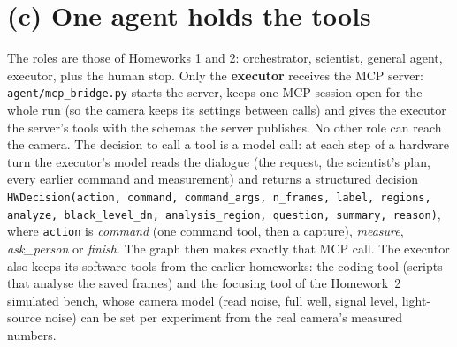 \documentclass[11pt,a4paper]{article}
\begin{document}
\section*{(c) One agent holds the tools}
The roles are those of Homeworks 1 and 2: orchestrator, scientist, general agent, executor, plus the human stop. Only the
\textbf{executor} receives the MCP server: \texttt{agent/mcp\_bridge.py} starts the server, keeps one MCP session open for
the whole run (so the camera keeps its settings between calls) and gives the executor the server's tools with the schemas
the server publishes. No other role can reach the camera.
The decision to call a tool is a model call: at each step of a hardware turn the executor's model reads the dialogue
(the request, the scientist's plan, every earlier command and measurement) and returns a structured decision
\texttt{HWDecision(action, command, command\_args, n\_frames, label, regions, analyze, black\_level\_dn,
analysis\_region, question, summary, reason)}, where
\texttt{action} is \emph{command} (one command tool, then a capture), \emph{measure}, \emph{ask\_person} or \emph{finish}.
The graph then makes exactly that MCP call. The executor also keeps its software tools from the earlier homeworks: the
coding tool (scripts that analyse the saved frames) and the focusing tool of the Homework~2 simulated bench, whose camera
model (read noise, full well, signal level, light-source noise) can be set per experiment from the real camera's
measured numbers.

\end{document}
